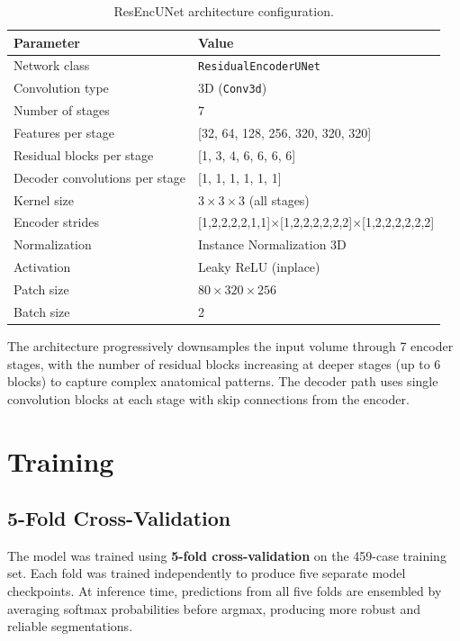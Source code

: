 \documentclass[12pt, a4paper]{article}
\begin{document}
\begin{table}[H]
\centering
\caption{ResEncUNet architecture configuration.}
\begin{tabular}{@{}ll@{}}
\toprule
\textbf{Parameter} & \textbf{Value} \\
\midrule
Network class & \texttt{ResidualEncoderUNet} \\
Convolution type & 3D (\texttt{Conv3d}) \\
Number of stages & 7 \\
Features per stage & [32, 64, 128, 256, 320, 320, 320] \\
Residual blocks per stage & [1, 3, 4, 6, 6, 6, 6] \\
Decoder convolutions per stage & [1, 1, 1, 1, 1, 1] \\
Kernel size & $3 \times 3 \times 3$ (all stages) \\
Encoder strides & [1,2,2,2,2,1,1]$\times$[1,2,2,2,2,2,2]$\times$[1,2,2,2,2,2,2] \\
Normalization & Instance Normalization 3D \\
Activation & Leaky ReLU (inplace) \\
Patch size & $80 \times 320 \times 256$ \\
Batch size & 2 \\
\bottomrule
\end{tabular}
\end{table}

The architecture progressively downsamples the input volume through 7 encoder stages, with the number of residual blocks increasing at deeper stages (up to 6 blocks) to capture complex anatomical patterns. The decoder path uses single convolution blocks at each stage with skip connections from the encoder.

\section{Training}

\subsection{5-Fold Cross-Validation}

The model was trained using \textbf{5-fold cross-validation} on the 459-case training set. Each fold was trained independently to produce five separate model checkpoints. At inference time, predictions from all five folds are ensembled by averaging softmax probabilities before argmax, producing more robust and reliable segmentations.
\end{document}
